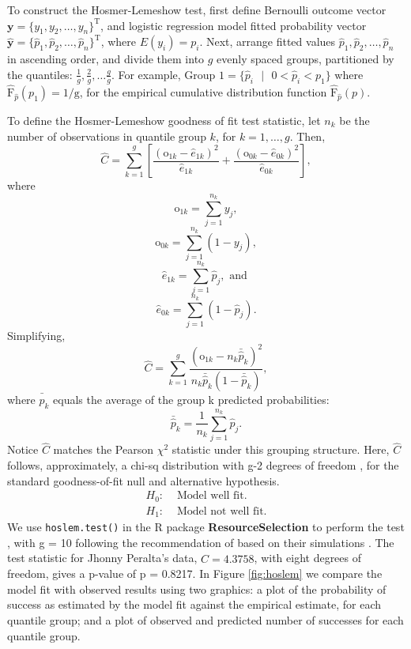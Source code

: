 To construct the Hosmer-Lemeshow test, first define Bernoulli outcome vector $\pmb{y} = \{y_{1}, y_{2}, \dots, y_{n}\}^{\text{T}}$, and logistic regression model fitted probability vector $\hat{\pmb{y}} = \{\hat{p}_{1}, \hat{p}_{2}, \dots, \hat{p}_{n}\}^{\text{T}}$, where $E(y_{i}) = p_{i}$. Next, arrange fitted values $\hat{p}_{1}, \hat{p}_{2}, \dots, \hat{p}_{n}$ in ascending order, and divide them into $g$ evenly spaced groups, partitioned by the quantiles: $\frac{1}{g}, \frac{2}{g}, \dots \frac{g}{g}$. For example, $\text{Group 1} = \{\hat{p}_{i}\text{ }|\text{ }0 < \hat{p}_{i} < p_{1}\}$ where $\hat{\text{F}}_{\hat{p}}(p_{1})=1/\text{g}$, for the empirical cumulative distribution function $\hat{\text{F}}_{\hat{p}}(p)$. 

To define the Hosmer-Lemeshow goodness of fit test statistic, let $n_{k}$ be the number of observations in quantile group $k$, for $k = 1, \dots, g$. Then,
$$ \widehat{C} = \sum_{k=1}^{g} \left[ \frac{(\text{o}_{1k}-\hat{e}_{1k})^{2}}{\hat{e}_{1k}} + \frac{(\text{o}_{0k}-\hat{e}_{0k})^{2}}{\hat{e}_{0k}}  \right], $$
where
$$ \text{o}_{1k} =  \sum_{j=1}^{n_{k}}y_{j},$$
$$ \text{o}_{0k} =  \sum_{j=1}^{n_{k}}(1-y_{j}),$$
$$ \hat{e}_{1k} = \sum_{j=1}^{n_{k}}\hat{p}_{j}, \text{ and }$$
$$ \hat{e}_{0k} = \sum_{j=1}^{n_{k}}(1-\hat{p}_{j}).$$
Simplifying, 
$$ \widehat{C} = \sum_{k=1}^{g} \frac{(\text{o}_{1k}-n_{k}\bar{\hat{p}}_{k})^{2}}{n_{k}\bar{\hat{p}}_{k}(1-\bar{\hat{p}}_{k})},$$
where $\bar{\hat{p}}_{k}$ equals the average of the group k predicted probabilities:
$$\bar{\hat{p}}_{k} = \frac{1}{n_{k}}\sum_{j=1}^{n_{k}}\hat{p}_{j}.$$
Notice $\widehat{C}$ matches the Pearson $\chi^{2}$ statistic under this grouping structure. Here, $\widehat{C}$ follows, approximately, a chi-sq distribution with g-2 degrees of freedom \citep{Hosmer1980}, for the standard goodness-of-fit null and alternative hypothesis.
\begin{align}
H_{0}: & \text{ Model well fit.} \\
H_{1}: & \text{ Model not well fit.}
\end{align}
We use \verb|hoslem.test()| in the R package {\bf ResourceSelection} to perform the test \citep{hoslem}, with g = 10 following the recommendation of \cite{Hosmer2013} based on their simulations \citep{Hosmer1980}. The test statistic for Jhonny Peralta's data, $\widehat{C} = 4.3758$, with eight degrees of freedom, gives a p-value of p = 0.8217. In Figure \ref{fig:hoslem} we compare the model fit with observed results using two graphics: a plot of the probability of success as estimated by the model fit against the empirical estimate, for each quantile group; and a plot of observed and predicted number of successes for each quantile group.
